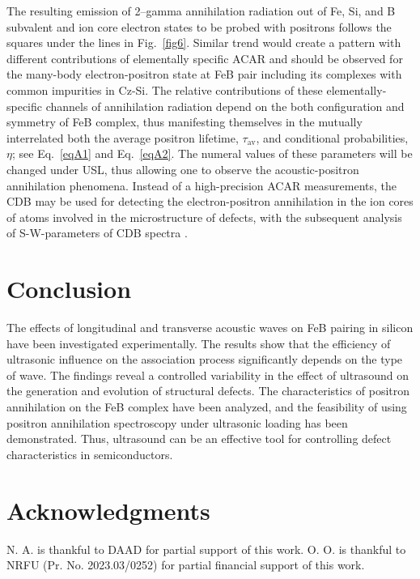\documentclass{ttp}
\begin{document}
The resulting emission of 2–gamma annihilation radiation out of Fe, Si, and B subvalent and ion core electron states
to be probed with positrons follows the squares under the lines in Fig.~\ref{fig6}.
Similar trend would create a pattern with different contributions of elementally specific ACAR 
and should be observed for the many-body electron-positron state at FeB pair including its complexes with common impurities in Cz-Si.
The relative contributions of these elementally-specific channels of annihilation radiation depend on the both configuration and symmetry of FeB complex,
thus manifesting themselves in the mutually interrelated both the average positron lifetime,
$\tau_\mathrm{av}$, and conditional probabilities, $\eta$;
see Eq.~\ref{eqA1} and Eq.~\ref{eqA2}.
The numeral values of these parameters will be changed under USL,
thus allowing one to observe the acoustic-positron annihilation phenomena.
Instead of a high-precision ACAR measurements, the CDB may be used for detecting the electron-positron annihilation in the ion cores
of atoms involved in the microstructure of defects, with the subsequent analysis of S-W-parameters of CDB spectra \cite{Krause1999}.

\section{Conclusion}

The effects of longitudinal and transverse acoustic waves on FeB pairing in silicon have been investigated experimentally.
The results show that the efficiency of ultrasonic influence on the association process significantly depends on the type of wave.
The findings reveal a controlled variability in the effect of ultrasound on the generation and evolution of structural defects.
The characteristics of positron annihilation on the FeB complex have been analyzed,
and the feasibility of using positron annihilation spectroscopy under ultrasonic loading has been demonstrated.
Thus, ultrasound can be an effective tool for controlling defect characteristics in semiconductors.



\section{Acknowledgments}
N. A. is thankful to DAAD for partial support of this work.
O. O. is thankful to NRFU (Pr. No. 2023.03/0252) for partial financial support of this work.
\end{document}
